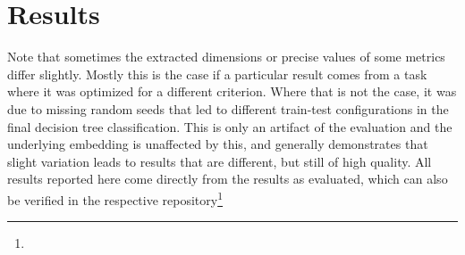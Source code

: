 \newcommand{\mfauhcsdT}{\specialcell[t]{\tabitem \textbf{Sentence-} \\ \textbf{~~~wise merge} \\ \tabitem \textbf{add titles} \\ \tabitem \textbf{add subtitles} \\ \tabitem \textbf{rm HTML-tags} \\ \tabitem \textbf{lower-case} \\ \tabitem \textbf{rm stopwords} \\ \tabitem \textbf{rm diacritics} \\ \tabitem \textbf{use SK-Learn} }}

\newcommand{\mfauhtcsldp}{\specialcell[t]{\tabitem \textbf{Sentence-} \\ \textbf{~~~wise merge} \\ \tabitem \textbf{add titles} \\ \tabitem \textbf{add subtitles} \\ \tabitem \textbf{rm HTML-tags} \\ \tabitem \textbf{Sentence-} \\ \textbf{~~~tokenisation} \\ \tabitem \textbf{lower-case} \\ \tabitem \textbf{rm stopwords} \\ \tabitem \textbf{Lemmatize} \\ \tabitem \textbf{rm diacritics} \\ \tabitem \textbf{rm punctuation} }}


\chapter{Results}

Note that sometimes the extracted dimensions or precise values of some metrics differ slightly. Mostly this is the case if a particular result comes from a task where it was optimized for a different criterion. Where that is not the case, it was due to missing random seeds that led to different train-test configurations in the final decision tree classification. This is only an artifact of the evaluation and the underlying embedding is unaffected by this, and generally demonstrates that slight variation leads to results that are different, but still of high quality.  All results reported here come directly from the results as evaluated, which can also be verified in the respective repository\footnote{}

